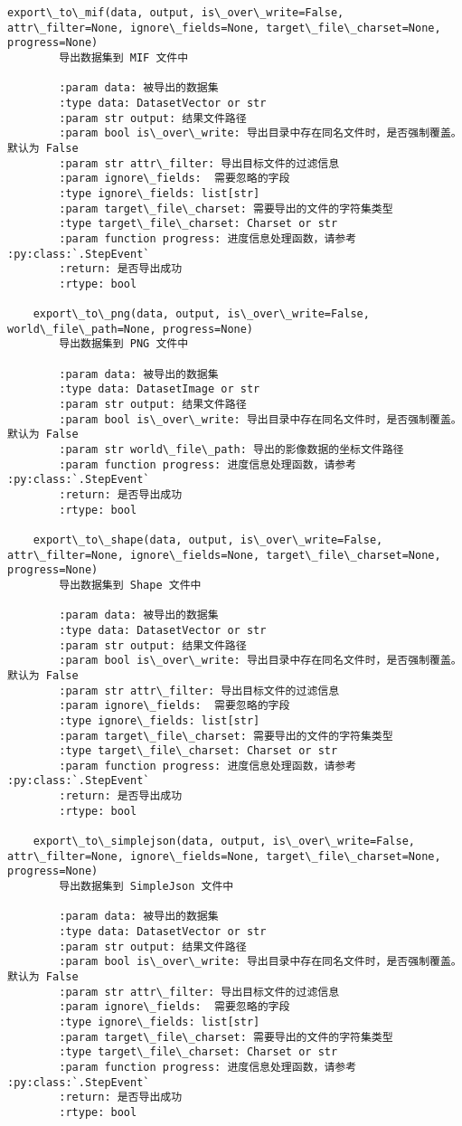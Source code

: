 \documentclass[11pt]{article}
\begin{document}
\begin{Verbatim}[commandchars=\\\{\}]
    export\_to\_mif(data, output, is\_over\_write=False, attr\_filter=None, ignore\_fields=None, target\_file\_charset=None, progress=None)
        导出数据集到 MIF 文件中
        
        :param data: 被导出的数据集
        :type data: DatasetVector or str
        :param str output: 结果文件路径
        :param bool is\_over\_write: 导出目录中存在同名文件时，是否强制覆盖。默认为 False
        :param str attr\_filter: 导出目标文件的过滤信息
        :param ignore\_fields:  需要忽略的字段
        :type ignore\_fields: list[str]
        :param target\_file\_charset: 需要导出的文件的字符集类型
        :type target\_file\_charset: Charset or str
        :param function progress: 进度信息处理函数，请参考 :py:class:`.StepEvent`
        :return: 是否导出成功
        :rtype: bool
    
    export\_to\_png(data, output, is\_over\_write=False, world\_file\_path=None, progress=None)
        导出数据集到 PNG 文件中
        
        :param data: 被导出的数据集
        :type data: DatasetImage or str
        :param str output: 结果文件路径
        :param bool is\_over\_write: 导出目录中存在同名文件时，是否强制覆盖。默认为 False
        :param str world\_file\_path: 导出的影像数据的坐标文件路径
        :param function progress: 进度信息处理函数，请参考 :py:class:`.StepEvent`
        :return: 是否导出成功
        :rtype: bool
    
    export\_to\_shape(data, output, is\_over\_write=False, attr\_filter=None, ignore\_fields=None, target\_file\_charset=None, progress=None)
        导出数据集到 Shape 文件中
        
        :param data: 被导出的数据集
        :type data: DatasetVector or str
        :param str output: 结果文件路径
        :param bool is\_over\_write: 导出目录中存在同名文件时，是否强制覆盖。默认为 False
        :param str attr\_filter: 导出目标文件的过滤信息
        :param ignore\_fields:  需要忽略的字段
        :type ignore\_fields: list[str]
        :param target\_file\_charset: 需要导出的文件的字符集类型
        :type target\_file\_charset: Charset or str
        :param function progress: 进度信息处理函数，请参考 :py:class:`.StepEvent`
        :return: 是否导出成功
        :rtype: bool
    
    export\_to\_simplejson(data, output, is\_over\_write=False, attr\_filter=None, ignore\_fields=None, target\_file\_charset=None, progress=None)
        导出数据集到 SimpleJson 文件中
        
        :param data: 被导出的数据集
        :type data: DatasetVector or str
        :param str output: 结果文件路径
        :param bool is\_over\_write: 导出目录中存在同名文件时，是否强制覆盖。默认为 False
        :param str attr\_filter: 导出目标文件的过滤信息
        :param ignore\_fields:  需要忽略的字段
        :type ignore\_fields: list[str]
        :param target\_file\_charset: 需要导出的文件的字符集类型
        :type target\_file\_charset: Charset or str
        :param function progress: 进度信息处理函数，请参考 :py:class:`.StepEvent`
        :return: 是否导出成功
        :rtype: bool
    

\end{Verbatim}
\end{document}
